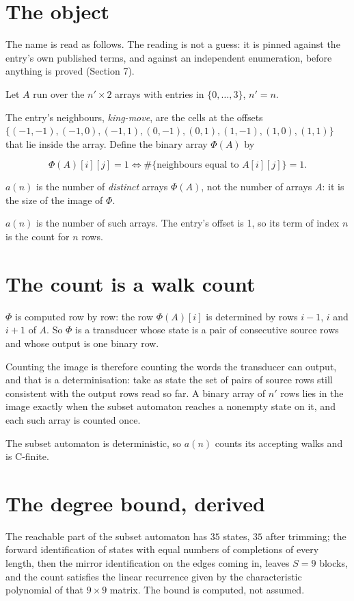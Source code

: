 \documentclass[11pt]{article}
\theoremstyle{definition}
\begin{document}
\section{The object}

The name is read as follows. The reading is not a guess: it is pinned against the entry's own published terms, and against an independent enumeration, before anything is proved (Section 7).

Let $A$ run over the $n' \times 2$ arrays with entries in $\{0,\dots,3\}$, $n' = n$.

The entry's neighbours, {\itshape king-move}, are the cells at the offsets $\{(-1,-1), (-1,0), (-1,1), (0,-1), (0,1), (1,-1), (1,0), (1,1)\}$ that lie inside the array. Define the binary array $\Phi(A)$ by

\[\Phi(A)[i][j] = 1 \iff \#\{\text{neighbours equal to } A[i][j]\} = 1.\]

$a(n)$ is the number of {\itshape distinct} arrays $\Phi(A)$, not the number of arrays $A$: it is the size of the image of $\Phi$.

$a(n)$ is the number of such arrays. The entry's offset is 1, so its term of index $n$ is the count for $n$ rows.

\section{The count is a walk count}

$\Phi$ is computed row by row: the row $\Phi(A)[i]$ is determined by rows $i-1$, $i$ and $i+1$ of $A$. So $\Phi$ is a transducer whose state is a pair of consecutive source rows and whose output is one binary row.

Counting the image is therefore counting the words the transducer can output, and that is a determinisation: take as state the set of pairs of source rows still consistent with the output rows read so far. A binary array of $n'$ rows lies in the image exactly when the subset automaton reaches a nonempty state on it, and each such array is counted once.

The subset automaton is deterministic, so $a(n)$ counts its accepting walks and is C-finite.

\section{The degree bound, derived}

The reachable part of the subset automaton has $35$ states, $35$ after trimming; the forward identification of states with equal numbers of completions of every length, then the mirror identification on the edges coming in, leaves $S = 9$ blocks, and the count satisfies the linear recurrence given by the characteristic polynomial of that $9\times9$ matrix. The bound is computed, not assumed.
\end{document}
